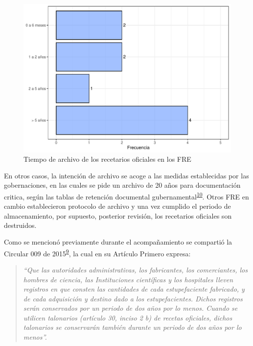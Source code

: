 \documentclass[
]{book}
\begin{document}
\begin{figure}

{\centering \includegraphics[width=0.85\linewidth]{InformeFinal_files/figure-latex/TiempoArchivoRecetariosOficiales-1} 

}

\caption{Tiempo de archivo de los recetarios oficiales en los FRE}\label{fig:TiempoArchivoRecetariosOficiales}
\end{figure}

En otros casos, la intención de archivo se acoge a las medidas establecidas por las gobernaciones, en las cuales se pide un archivo de 20 años para documentación critica, según las tablas de retención documental gubernamental\textsuperscript{\protect\hyperlink{ref-PresidenciadelaRepublicadeColombia2012}{10}}. Otros FRE en cambio establecieron protocolo de archivo y una vez cumplido el periodo de almacenamiento, por supuesto, posterior revisión, los recetarios oficiales son destruidos.

Como se mencionó previamente durante el acompañamiento se compartió la Circular 009 de 2015\textsuperscript{\protect\hyperlink{ref-FNE2015-9}{9}}, la cual en su Artículo Primero expresa:

\begin{quote}
\emph{``Que las autoridades administrativas, los fabricantes, los comerciantes, los hombres de ciencia, las Instituciones científicas y los hospitales lleven registros en que consten las cantidades de cada estupefaciente fabricado, y de cada adquisición y destino dado a los estupefacientes. Dichos registros serán conservados por un periodo de dos años por lo menos. Cuando se utilicen talonarios (artículo 30, inciso 2 b) de recetas oficiales, dichos talonarios se conservarán también durante un periodo de dos años por lo menos''.}
\end{quote}
\end{document}
